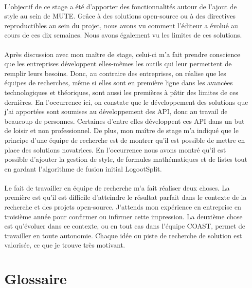 \documentclass[12pt]{article}
\begin{document}
\paragraph{}
L'objectif de ce stage a été d'apporter des fonctionnalités autour de l'ajout de style au sein de MUTE. Grâce à des solutions open-source ou à des directives reproductibles au sein du projet, nous avons vu comment l'éditeur a évolué au cours de ces dix semaines. Nous avons également vu les limites de ces solutions.
\paragraph{}
Après discussion avec mon maître de stage, celui-ci m'a fait prendre conscience que les entreprises développent elles-mêmes les outils qui leur permettent de remplir leurs besoins. Donc, au contraire des entreprises, on réalise que les équipes de recherches, même si elles sont en première ligne dans les avancées technologiques et théoriques, sont aussi les premières à pâtir des limites de ces dernières. En l'occurrence ici, on constate que le développement des solutions que j'ai apportées sont soumises au développement des API, donc au travail de beaucoup de personnes. Certaines d'entre elles développent ces API dans un but de loisir et non professionnel. De plus, mon maître de stage m'a indiqué que le principe d'une équipe de recherche est de montrer qu'il est possible de mettre en place des solutions novatrices. En l'occurrence nous avons montré qu'il est possible d'ajouter la gestion de style, de formules mathématiques et de listes tout en gardant l'algorithme de fusion initial LogootSplit.
\paragraph{}
Le fait de travailler en équipe de recherche m'a fait réaliser deux choses. La première est qu'il est difficile d'atteindre le résultat parfait dans le contexte de la recherche et des projets open-source. J'attends mon expérience en entreprise en troisième année pour confirmer ou infirmer cette impression. La deuxième chose est qu'évoluer dans ce contexte, ou en tout cas dans l'équipe COAST, permet de travailler en toute autonomie. Chaque idée ou piste de recherche de solution est valorisée, ce que je trouve très motivant.

\newpage
\printbibliography[heading=bibintoc,title={Webographie}]

\newpage
{}
\section*{Glossaire}
\end{document}
